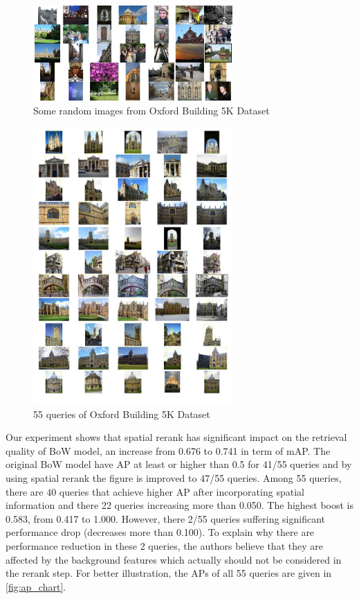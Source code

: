 \begin{figure}
    \centering
    \includegraphics[width=3.0in]{oxbuilding.jpg}
    \caption{Some random images from Oxford Building 5K Dataset}
    \label{fig:oxbuilding}
\end{figure}

\begin{figure}
    \centering
    \includegraphics[width=3.0in]{oxbuilding_query.pdf}
    \caption{55 queries of Oxford Building 5K Dataset}
    \label{fig:oxbuilding_query}
\end{figure}

Our experiment shows that spatial rerank has significant impact on the retrieval quality of BoW model, an increase from 0.676 to 0.741 in term of mAP. The original BoW model have AP at least or higher than 0.5 for 41/55 queries and by using spatial rerank the figure is improved to 47/55 queries. Among 55 queries, there are 40 queries that achieve higher AP after incorporating spatial information and there 22 queries increasing more than 0.050. The highest boost is 0.583, from 0.417 to 1.000. However, there 2/55 queries suffering significant performance drop (decreases more than 0.100). To explain why there are performance reduction in these 2 queries, the authors believe that they are affected by the background features which actually should not be considered in the rerank step. For better illustration, the APs of all 55 queries are given in \ref{fig:ap_chart}.

